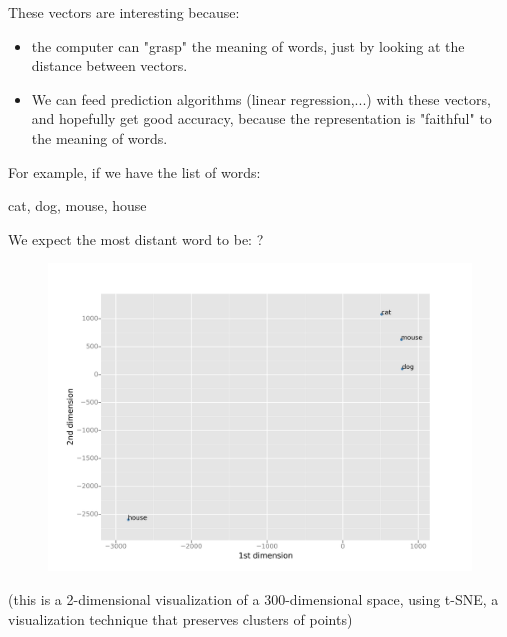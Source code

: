 \documentclass{beamer}
\begin{document}
\begin{frame}
These vectors are interesting because:

\begin{itemize}
\item the computer can "grasp" the meaning of words, just by looking at the distance between vectors.
\item We can feed prediction algorithms (linear regression,...) with these vectors, and hopefully get good accuracy, because the representation is "faithful" to the meaning of words.
\end{itemize}

\end{frame}



\begin{frame}

For example, if we have the list of words: 

\bigskip

\begin{center}
cat, dog, mouse, house

\end{center}

\bigskip

We expect the most distant word to be: ?



\end{frame}

\begin{frame}



\begin{figure}
\includegraphics[width=0.85\linewidth]{wordsinenglishtsnesklearn.png}
\end{figure}


(this is a 2-dimensional visualization of a 300-dimensional space, using t-SNE, a visualization technique that preserves clusters of points)


\end{frame}
\end{document}
